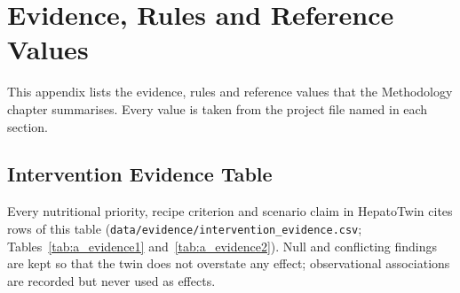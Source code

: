 
\chapter{Evidence, Rules and Reference Values}
\label{app:evidence}

This appendix lists the evidence, rules and reference values that the
Methodology chapter summarises. Every value is taken from the project file
named in each section.

\section{Intervention Evidence Table}
\label{app:a_evidence}

Every nutritional priority, recipe criterion and scenario claim in HepatoTwin
cites rows of this table (\nolinkurl{data/evidence/intervention_evidence.csv};
Tables~\ref{tab:a_evidence1} and~\ref{tab:a_evidence2}). Null and conflicting
findings are kept so that the twin does not overstate any effect;
observational associations are recorded but never used as effects.


